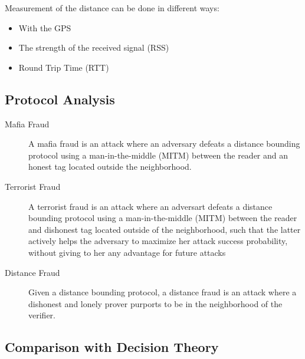 Measurement of the distance can be done in different ways:
\begin{itemize}
    \item With the GPS
    \item The strength of the received signal  (RSS)
    \item Round Trip Time (RTT)
\end{itemize}

\subsection{Protocol Analysis}
\begin{description}
    \item[Mafia Fraud] A mafia fraud is an attack where an adversary defeats a
    distance bounding protocol using a man-in-the-middle (MITM) between the
    reader and an honest tag located outside the neighborhood.
    \item[Terrorist Fraud] A terrorist fraud is an attack where an adversart
    defeats a distance bounding protocol using a man-in-the-middle (MITM)
    between the reader and dishonest tag located outside of the neighborhood,
    such that the latter actively helps the adversary to maximize her attack
    success probability, without giving to her any advantage for future attacks
    \item[Distance Fraud] Given a distance bounding protocol, a distance fraud
    is an attack where a dishonest and lonely prover purports to be in the
    neighborhood of the verifier.
\end{description}


\subsection{Comparison with Decision Theory}
